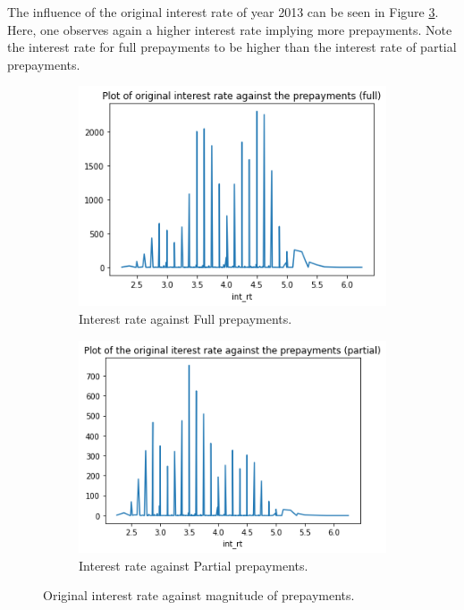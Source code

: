         \noindent
        The influence of the original interest rate of year 2013 can be seen in Figure \ref{model_int_rt_against_prepayment}. Here, one observes again a higher interest rate implying more prepayments. Note the interest rate for full prepayments to be higher than the interest rate of partial prepayments. 
        \begin{figure}[H]
            \centering
            \begin{subfigure}{0.45\textwidth}
                \includegraphics[width=\linewidth]{Latex/Report/Figures/int_rt againts Full prepayments.png}
                \caption{Interest rate against Full prepayments.}
                \label{model_int_rt_against_full_prepayment}
            \end{subfigure}
            \begin{subfigure}{0.45\textwidth}
                \includegraphics[width=\linewidth]{Latex/Report/Figures/int_rt againts Partial prepayments.png}
                \caption{Interest rate against Partial prepayments.}
                \label{model_int_rt_against_partial_prepayment}
            \end{subfigure}
            \caption{Original interest rate against magnitude of prepayments.}
            \label{model_int_rt_against_prepayment}
        \end{figure}
        
    
    

    



